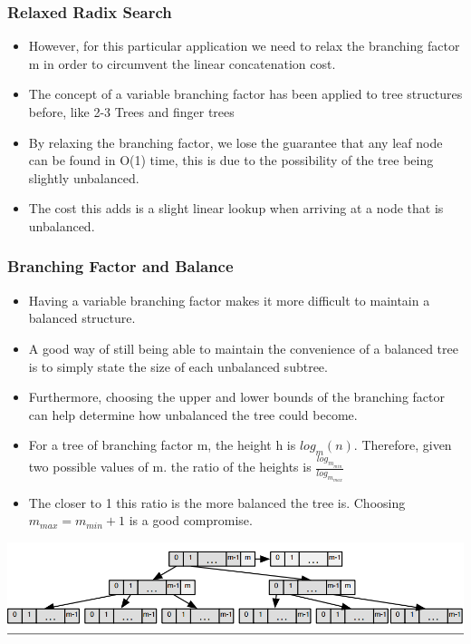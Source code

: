 \documentclass{beamer}
\begin{document}
\begin{frame}
\frametitle{Relaxed Radix Search}

	\begin{itemize}
		\item However, for this particular application we need to relax the branching factor m in order to circumvent the linear concatenation cost.
		\item The concept of a variable branching factor has been applied to tree structures before, like 2-3 Trees and finger trees
		\item By relaxing the branching factor, we lose the guarantee that any leaf node can be found in O(1) time, this is due to the possibility of the tree being slightly unbalanced. 
		\item The cost this adds is a slight linear lookup when arriving at a node that is unbalanced.
	
	\end{itemize}

\end{frame}

\begin{frame}
\frametitle{Branching Factor and Balance}

	\begin{itemize}
		\item Having a variable branching factor makes it more difficult to maintain a balanced structure. \pause
		\item A good way of still being able to maintain the convenience of a balanced tree is to simply state the size of each unbalanced subtree. \pause
		\item Furthermore, choosing the upper and lower bounds of the branching factor can help determine how unbalanced the tree could become. \pause
		\item For a tree of branching factor m, the height h is $log_m (n)$. Therefore, given two possible values of m. the ratio of the heights is $\frac{log_{m_{min}}}{log_{m_{max}}}$ \pause
		\item The closer to 1 this ratio is the more balanced the tree is. Choosing $m_{max} = m_{min} + 1$ is a good compromise. \pause
	
	\end{itemize}
	
	\begin{center}
	
	\includegraphics[scale=0.25]{relaxedradixbalancedtree.png}
	
	\end{center}

\end{frame}
 
\end{document}
